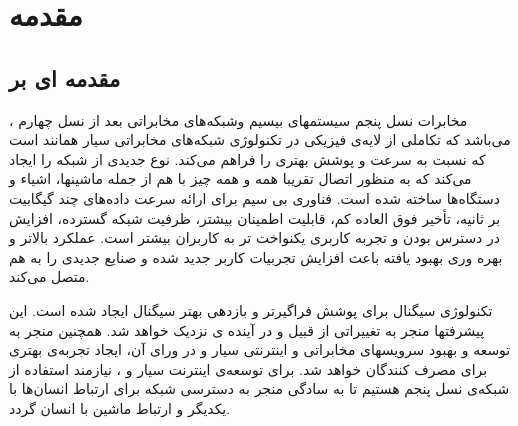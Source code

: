 \chapter{مقدمه}
\section{مقدمه ای بر  }
،
مخابرات نسل پنجم
سیستمهای بیسیم  وشبکه‌های مخابراتی بعد از نسل چهارم می‌باشد که تکاملی از لایه‌ی فیزیکی در تکنولوژی شبکه‌های مخابراتی سیار همانند  است که نسبت به  سرعت و پوشش بهتری را فراهم می‌کند.
نوع جدیدی از شبکه را ایجاد می‌کند که به منظور اتصال تقریبا همه و همه چیز با هم از جمله ماشینها، اشیاء و دستگاه‌ها ساخته شده است.
 فناوری بی سیم برای ارائه سرعت داده‌های چند گیگابیت بر ثانیه، تأخیر فوق العاده کم، قابلیت اطمینان بیشتر، ظرفیت شبکه گسترده، افزایش در دسترس بودن و تجربه کاربری یکنواخت تر به کاربران بیشتر است. عملکرد بالاتر و بهره وری بهبود یافته باعث افزایش تجربیات کاربر جدید شده و صنایع جدیدی را به هم متصل می‌کند.
 
 
تکنولوژی سیگنال   برای پوشش فراگیرتر و بازدهی بهتر سیگنال ایجاد شده است. این پیشرفتها منجر به تغییراتی از قبیل  و  در آینده ی نزدیک خواهد شد.
همچنین  منجر به توسعه و بهبود سرویسهای مخابراتی و اینترنتی سیار و در ورای آن، ایجاد تجربه‌ی بهتری برای مصرف کنندگان خواهد شد.\newline
برای توسعه‌ی اینترنت سیار و ، نیازمند استفاده از شبکه‌ی نسل پنجم هستیم تا به سادگی منجر به دسترسی شبکه برای ارتباط انسان‌ها با یکدیگر و ارتباط ماشین با انسان گردد.

